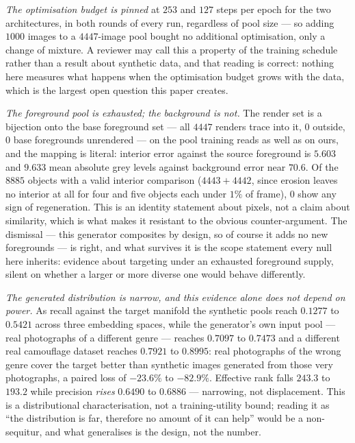 \documentclass{article} %
\begin{document}
\emph{The optimisation budget is pinned} at $253$ and $127$ steps per epoch for the two
architectures, in both rounds of every run, regardless of pool size --- so adding $1000$ images to a
$4447$-image pool bought no additional optimisation, only a change of mixture. A reviewer may call
this a property of the training schedule rather than a result about synthetic data, and that reading
is correct: nothing here measures what happens when the optimisation budget grows with the data,
which is the largest open question this paper creates.

\emph{The foreground pool is exhausted; the background is not.} The render set is a bijection onto the
base foreground set --- all $4447$ renders trace into it, $0$ outside, $0$ base foregrounds unrendered
--- on the pool training reads as well as on ours, and the mapping is literal: interior error against
the source foreground is $5.603$ and $9.633$ mean absolute grey levels against background error near
$70.6$. Of the $8885$ objects with a valid interior comparison ($4443+4442$, since erosion leaves no
interior at all for four and five objects each under $1\%$ of frame), $0$ show any sign of
regeneration. This is an identity statement
about pixels, not a claim about similarity, which is what makes it resistant to the obvious
counter-argument. The dismissal --- this generator composites by design, so of course it adds no new
foregrounds --- is right, and what survives it is the scope statement every null here inherits:
evidence about targeting under an exhausted foreground supply, silent on whether a larger or more
diverse one would behave differently.

\emph{The generated distribution is narrow, and this evidence alone does not depend on power.} As
recall against the target manifold the synthetic pools reach $0.1277$ to $0.5421$ across three
embedding spaces, while the generator's own input pool --- real photographs of a different genre ---
reaches $0.7097$ to $0.7473$ and a different real camouflage dataset reaches $0.7921$ to $0.8995$: real
photographs of the wrong genre cover the target better than synthetic images generated from those very
photographs, a paired loss of $-23.6\%$ to $-82.9\%$. Effective rank falls $243.3$ to $193.2$ while
precision \emph{rises} $0.6490$ to $0.6886$ --- narrowing, not displacement. This is a distributional
characterisation, not a training-utility bound; reading it as ``the distribution is far, therefore no
amount of it can help'' would be a non-sequitur, and what generalises is the design, not the number.
\end{document}
